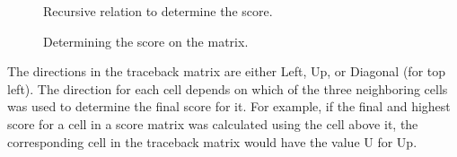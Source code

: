 \documentclass[conference]{IEEEtran}
\begin{document}
\begin{figure}[htbp]
\centerline{}
\caption{Recursive relation to determine the score. \cite{vladimir}}
\label{4}
\end{figure}

\begin{figure}[htbp]
\centerline{}
\caption{Determining the score on the matrix. \cite{vladimir}}
\label{5}
\end{figure}

The directions in the traceback matrix are either Left, Up, or Diagonal (for top left). The direction for each cell depends on which of the three neighboring cells was used to determine the final score for it. For example, if the final and highest score for a cell in a score matrix was calculated using the cell above it, the corresponding cell in the traceback matrix would have the value U for Up.
\end{document}
